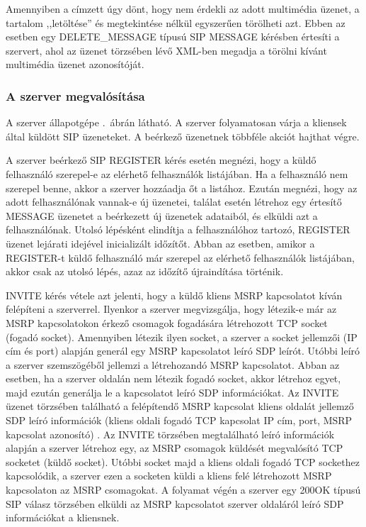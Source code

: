 Amennyiben a címzett úgy dönt, hogy nem érdekli az adott multimédia üzenet, a tartalom ,,letöltése'' és megtekintése nélkül egyszerűen törölheti azt. Ebben az esetben egy DELETE\_MESSAGE típusú SIP MESSAGE kérésben értesíti a szervert, ahol az üzenet törzsében lévő XML-ben megadja a törölni kívánt multimédia üzenet azonosítóját. 

\subsubsection{A szerver megvalósítása}
\label{sec:szervermegvalositas}

A szerver állapotgépe .~ábrán látható. A szerver folyamatosan várja a kliensek által küldött SIP üzeneteket. A beérkező üzenetnek többféle akciót hajthat végre.

A szerver beérkező SIP REGISTER kérés esetén megnézi, hogy a küldő felhasználó szerepel-e az elérhető felhasználók listájában. Ha a felhasználó nem szerepel benne, akkor a szerver hozzáadja őt a listához. Ezután megnézi, hogy az adott felhasználónak vannak-e új üzenetei, találat esetén létrehoz egy értesítő MESSAGE üzenetet a beérkezett új üzenetek adataiból, és elküldi azt a felhasználónak. Utolsó lépésként elindítja a felhasználóhoz tartozó, REGISTER üzenet lejárati idejével inicializált időzítőt. Abban az esetben, amikor a REGISTER-t küldő felhasználó már szerepel az elérhető felhasználók listájában, akkor csak az utolsó lépés, azaz az időzítő újraindítása történik.

INVITE kérés vétele azt jelenti, hogy a küldő kliens MSRP kapcsolatot kíván felépíteni a szerverrel. Ilyenkor a szerver megvizsgálja, hogy létezik-e már az MSRP kapcsolatokon érkező csomagok fogadására létrehozott TCP socket (fogadó socket). Amennyiben létezik ilyen socket, a szerver a socket jellemzői (IP cím és port) alapján generál egy MSRP kapcsolatot leíró SDP leírót. Utóbbi leíró a szerver szemszögéből jellemzi a létrehozandó MSRP kapcsolatot. Abban az esetben, ha a szerver oldalán nem létezik fogadó socket, akkor létrehoz egyet, majd ezután generálja le a kapcsolatot leíró SDP információkat.  Az INVITE üzenet törzsében található a felépítendő MSRP kapcsolat kliens oldalát jellemző SDP leíró információk (kliens oldali fogadó TCP kapcsolat IP cím, port, MSRP kapcsolat azonosító) . Az INVITE törzsében megtalálható leíró információk alapján a szerver létrehoz egy, az MSRP csomagok küldését megvalósító TCP socketet (küldő socket). Utóbbi socket majd a kliens oldali fogadó TCP sockethez kapcsolódik, a szerver ezen a socketen küldi a kliens felé létrehozott MSRP kapcsolaton az MSRP csomagokat. A folyamat végén a szerver egy 200OK típusú SIP válasz törzsében elküldi az MSRP kapcsolatot szerver oldaláról leíró SDP információkat a kliensnek.

